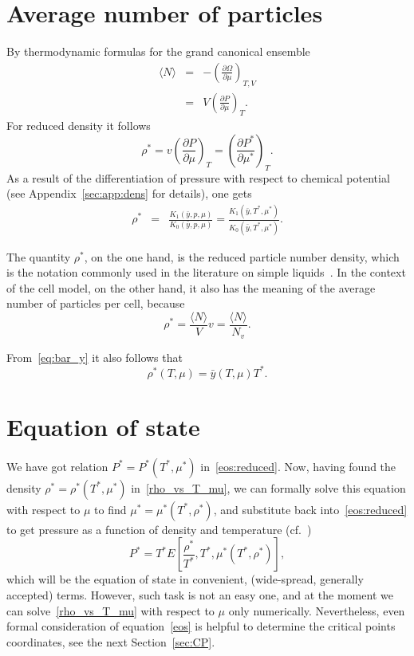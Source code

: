 \documentclass[12pt]{article}
\numberwithin{equation}{section}
\begin{document}
	
	\pagebreak
	\section{Average number of particles}
	By thermodynamic formulas for the grand canonical ensemble
	\begin{eqnarray}
		\langle N \rangle & = & -\left(\frac{\partial \Omega}{\partial \mu}\right)_{T,V}
		\nonumber\\
		& = & V \left(\frac{\partial P}{\partial \mu}\right)_T.
	\end{eqnarray}
	For reduced density it follows
	\begin{equation}
		\label{eq:dens}
		\rho^* = v\left(\frac{\partial P}{\partial \mu}\right)_T = \left(\frac{\partial P^*}{\partial \mu^*}\right)_T.
	\end{equation}
	As a result of the differentiation of pressure with respect to chemical potential (see Appendix~\ref{sec:app:dens} for details), one gets
	\begin{eqnarray}
		\label{eq:densK}
		\rho^* &=& \frac{K_1(\bar{y}, p,\mu)}{K_0(\bar{y},p,\mu)} = \frac{K_1(\bar{y},T^*,\mu^*)}{K_0(\bar{y},T^*,\mu^*)}.
	\end{eqnarray}
	
	The quantity $\rho^*$, on the one hand, is the reduced particle number density, which is the notation commonly used in the literature on simple liquids~\cite{HansenMcDonald13}. In the context of the cell model, on the other hand, it also has the meaning of the average number of particles per cell, because
	\begin{equation}
		\rho^* = \frac{\langle N \rangle}{V} v = \frac{\langle N \rangle}{N_v}.
	\end{equation}
	
	From~\eqref{eq:bar_y} it also follows that
	\begin{equation}
		\label{rho_vs_T_mu}
		\rho^*(T,\mu) = \bar{y}(T,\mu) T^*.
	\end{equation}
	
	\section{Equation of state}
	We have got relation $P^* = P^*(T^*, \mu^*)$ in~\eqref{eos:reduced}. Now, having found the density $\rho^* = \rho^*(T^*,\mu^*)$ in~\eqref{rho_vs_T_mu}, we can formally solve this equation with respect to $\mu$ to find $\mu^* = \mu^*(T^*,\rho^*)$, and substitute back into~\eqref{eos:reduced} to get pressure as a function of density and temperature (cf.~\cite[(2.28)]{KKD20})
	\begin{equation}
		\label{eos}
		P^* = T^* E\left[\frac{\rho^*}{T^*},T^*, \mu^*(T^*,\rho^*)\right],
	\end{equation}
	which will be the equation of state in convenient, (wide-spread, generally accepted) terms. However, such task is not an easy one, and at the moment we can solve~\eqref{rho_vs_T_mu} with respect to $\mu$ only numerically. Nevertheless, even formal consideration of equation~\eqref{eos} is helpful to determine the critical points coordinates, see the next Section~\ref{sec:CP}.
	
\end{document}
